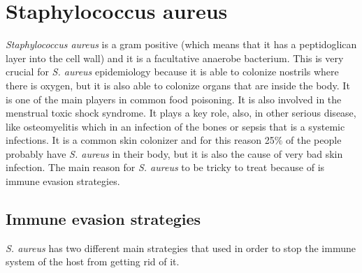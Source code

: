 \graphicspath{{chapters/images/09/}}

\chapter{Staphylococcus aureus}

\emph{Staphylococcus aureus} is a gram positive (which means that it has a peptidoglican layer into the cell wall) and it is a facultative anaerobe bacterium. This is very crucial for \emph{S. aureus} epidemiology because it is able to colonize nostrils where there is oxygen, but it is also able to colonize organs that are inside the body. It is  one of the main players in common food poisoning. It is also involved in the menstrual toxic shock syndrome. It plays a key role, also, in other serious disease, like osteomyelitis which in an infection of the bones or sepsis that is a systemic infections. 
It is a common skin colonizer and for this reason 25$\%$ of the people probably have \emph{S. aureus} in their body, but it is also the cause of very bad skin infection. 
The main reason for \emph{S. aureus} to be tricky to treat because of is immune evasion strategies.

\section{Immune evasion strategies}

\emph{S. aureus} has two different main strategies that used in order to stop the immune system of the host from getting rid of it. 

